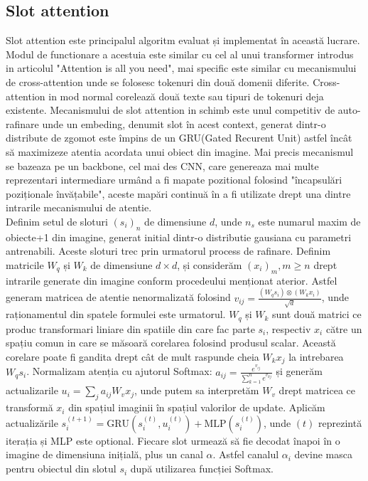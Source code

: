 \subsection{Slot attention}
Slot attention\cite{locatello2020object} este principalul algoritm evaluat și implementat în această lucrare. Modul de functionare a acestuia este similar cu cel al unui transformer introdus in articolul "Attention is all you need"\cite{vaswani2017attention},
mai specific este similar cu mecanismului de cross-attention unde se folosesc tokenuri din două domenii diferite. Cross-attention in mod normal corelează două texte sau tipuri de tokenuri deja existente.
Mecanismului de slot attention in schimb este unul competitiv de auto-rafinare unde un embeding, denumit slot în acest context, generat dintr-o distribute de zgomot este împins de un GRU(Gated Recurent Unit)\cite{GRU_ChungGCB14} astfel încât
să maximizeze atentia acordata unui obiect din imagine. Mai precis mecanismul se bazeaza pe un backbone, cel mai des CNN, care genereaza mai multe reprezentari intermediare urmând a fi mapate pozitional folosind "încapsulări poziționale învățabile"\cite{chowdhury2025loopelearnableoptimalpatch},
aceste mapări continuă în a fi utilizate drept una dintre intrarile mecanismului de atentie.
\\
Definim setul de sloturi $(s_i)_n$ de dimensiune $d$, unde $n_s$ este numarul maxim de obiecte+1 din imagine, generat initial dintr-o distributie gausiana cu parametri antrenabili. Aceste sloturi trec prin urmatorul process de rafinare. Definim matricile $W_q$ și $W_k$ de dimensiune $d \times d$,
și considerăm $(x_i)_m, m \ge n $ drept intrarile generate din imagine conform procedeului menționat aterior. Astfel generam matricea de atentie nenormalizată folosind $v_{ij}=\displaystyle\frac{(W_qs_i)\otimes (W_kx_i)}{\sqrt{d}}$,
unde raționamentul din spatele formulei este urmatorul. $W_q$ și $W_k$ sunt două matrici ce produc transformari liniare din spatiile din care fac parte $s_i$, respectiv $x_i$ către un spațiu comun in care se măsoară corelarea folosind produsul scalar. Această corelare poate fi gandita drept cât de mult raspunde
cheia $W_kx_j$ la intrebarea $W_qs_i$. Normalizam atenția cu ajutorul Softmax: $a_{ij}=\displaystyle\frac{e^{v_{ij}}}{\displaystyle\sum_{k=1}^{n}e^{v_{kj}}}$ și generăm actualizarile $u_i=\displaystyle\sum_{j}a_{ij}W_vx_j$, unde putem sa interpretăm $W_v$ drept matricea ce transformă $x_i$ din spațiul imaginii în spațiul valorilor de update.
Aplicăm actualizările $s_i^{(t+1)}=\text{GRU}(s_i^{(t)},u_i^{(t)})+\text{MLP}(s_i^{(t)})$, unde $(t)$ reprezintă iterația și MLP este optional. Fiecare slot urmează să fie decodat înapoi în o imagine de dimensiuna inițială, plus un canal $\alpha$. Astfel canalul $\alpha_i$ devine masca pentru obiectul din slotul $s_i$ după
utilizarea funcției Softmax.



